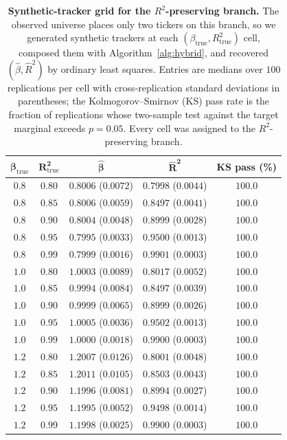 \begin{table}[H]
\centering
\caption{\textbf{Synthetic-tracker grid for the $R^2$-preserving
    branch.} The observed universe places only two tickers on this
    branch, so we generated synthetic trackers at each
    $(\beta_{\mathrm{true}}, R^2_{\mathrm{true}})$ cell, composed them
    with Algorithm~\ref{alg:hybrid}, and recovered
    $(\hat\beta, \hat R^2)$ by ordinary least squares. Entries are
    medians over $100$ replications per cell with cross-replication
    standard deviations in parentheses; the Kolmogorov--Smirnov (KS)
    pass rate is the fraction of replications whose two-sample test
    against the target marginal exceeds $p = 0.05$. Every cell was
    assigned to the $R^2$-preserving branch.}
\label{tab:tracker_grid}
\small
\begin{tabular}{@{}ccccc@{}}
\toprule
$\boldsymbol{\beta_{\mathrm{true}}}$ &
$\boldsymbol{R^2_{\mathrm{true}}}$ &
$\boldsymbol{\hat\beta}$ & $\boldsymbol{\hat R^2}$ &
\textbf{KS pass (\%)} \\ \midrule
$0.8$ & $0.80$ & $0.8006$ ($0.0072$) & $0.7998$ ($0.0044$) & $100.0$ \\
$0.8$ & $0.85$ & $0.8006$ ($0.0059$) & $0.8497$ ($0.0041$) & $100.0$ \\
$0.8$ & $0.90$ & $0.8004$ ($0.0048$) & $0.8999$ ($0.0028$) & $100.0$ \\
$0.8$ & $0.95$ & $0.7995$ ($0.0033$) & $0.9500$ ($0.0013$) & $100.0$ \\
$0.8$ & $0.99$ & $0.7999$ ($0.0016$) & $0.9901$ ($0.0003$) & $100.0$ \\ \midrule
$1.0$ & $0.80$ & $1.0003$ ($0.0089$) & $0.8017$ ($0.0052$) & $100.0$ \\
$1.0$ & $0.85$ & $0.9994$ ($0.0084$) & $0.8497$ ($0.0039$) & $100.0$ \\
$1.0$ & $0.90$ & $0.9999$ ($0.0065$) & $0.8999$ ($0.0026$) & $100.0$ \\
$1.0$ & $0.95$ & $1.0005$ ($0.0036$) & $0.9502$ ($0.0013$) & $100.0$ \\
$1.0$ & $0.99$ & $1.0000$ ($0.0018$) & $0.9900$ ($0.0003$) & $100.0$ \\ \midrule
$1.2$ & $0.80$ & $1.2007$ ($0.0126$) & $0.8001$ ($0.0048$) & $100.0$ \\
$1.2$ & $0.85$ & $1.2011$ ($0.0105$) & $0.8503$ ($0.0043$) & $100.0$ \\
$1.2$ & $0.90$ & $1.1996$ ($0.0081$) & $0.8994$ ($0.0027$) & $100.0$ \\
$1.2$ & $0.95$ & $1.1995$ ($0.0052$) & $0.9498$ ($0.0014$) & $100.0$ \\
$1.2$ & $0.99$ & $1.1998$ ($0.0025$) & $0.9900$ ($0.0003$) & $100.0$ \\
\bottomrule
\end{tabular}
\end{table}

